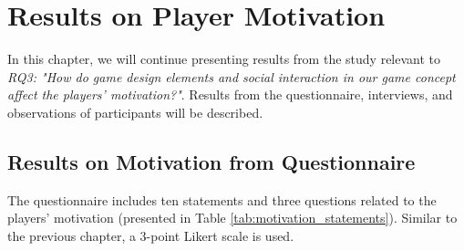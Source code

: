 \section{Results on Player Motivation}
\label{chap:player_motivation}
In this chapter, we will continue presenting results from the study relevant to \textit{RQ3: "How do game design elements and social interaction in our game concept affect the players’ motivation?"}. Results from the questionnaire, interviews, and observations of participants will be described.

\subsection{Results on Motivation from Questionnaire}
The questionnaire includes ten statements and three questions related to the players’ motivation (presented in Table \ref{tab:motivation_statements}). Similar to the previous chapter, a 3-point Likert scale is used.


